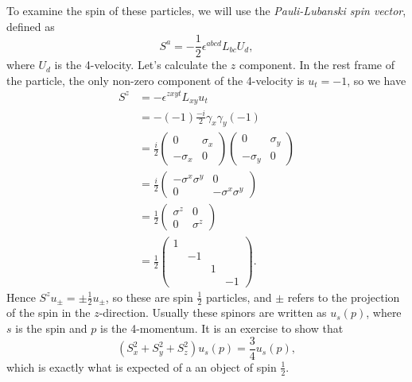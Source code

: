 \documentclass{jknotes} %
\begin{document}
To examine the spin of these particles, we will use the \emph{Pauli-Lubanski spin vector}, defined as
\begin{equation}
    S^a = -\frac{1}{2}\epsilon^{abcd}L_{bc}U_d,
\end{equation}
where \(U_d\) is the 4-velocity. Let's calculate the \(z\) component. In the rest frame of the particle, the only non-zero component of the 4-velocity is \(u_t = -1\), so we have
\begin{align}
    S^z &= -\epsilon^{zxyt}L_{xy}u_t \\
        &= -(-1)\frac{-i}{2}\gamma_x\gamma_y(-1) \\
        &= \frac{i}{2}
    \begin{pmatrix}
        0 & \sigma_x \\ -\sigma_x & 0
    \end{pmatrix}
    \begin{pmatrix}
        0 & \sigma_y \\ -\sigma_y & 0
    \end{pmatrix} \\
    &= \frac{i}{2}
    \begin{pmatrix}
        -\sigma^x\sigma^y & 0 \\ 0 & -\sigma^x\sigma^y
    \end{pmatrix} \\
    &= \frac{1}{2}
    \begin{pmatrix}
        \sigma^z & 0 \\ 0 & \sigma^z
    \end{pmatrix} \\
    &= \frac{1}{2}
    \begin{pmatrix}
        1 \\ 
        & -1 \\
        & & 1 \\
        & & & -1
    \end{pmatrix}.
\end{align}
Hence \(S^zu_\pm = \pm\frac{1}{2}u_\pm\), so these are spin \(\frac{1}{2}\) particles, and \(\pm\) refers to the projection of the spin in the \(z\)-direction. Usually these spinors are written as \(u_s(p)\), where \(s\) is the spin and \(p\) is the 4-momentum. It is an exercise to show that
\begin{equation}
    (S_x^2+S_y^2+S_z^2)u_s(p) = \frac{3}{4}u_s(p),
\end{equation}
which is exactly what is expected of a an object of spin \(\frac{1}{2}\).
\end{document}

